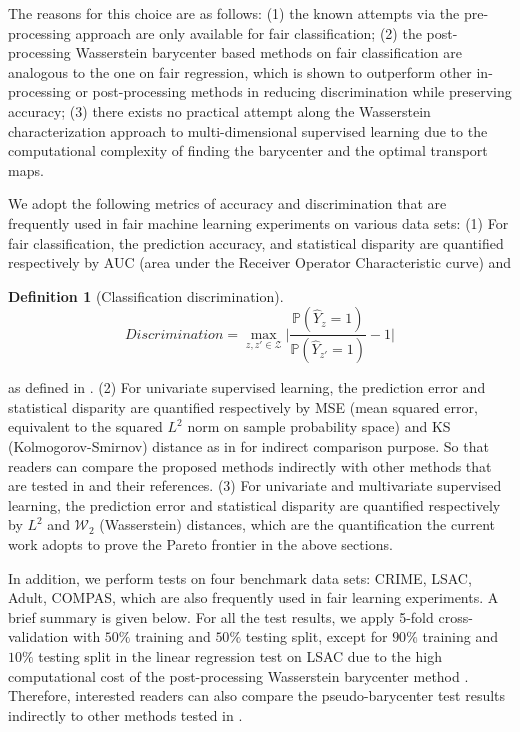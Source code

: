 \documentclass[twoside,11pt]{article}
\newtheorem{defi}{Definition}[section]{\bfseries}{\itshape}
\begin{document}
The reasons for this choice are as follows: (1) the known attempts via the pre-processing approach are only available for fair classification; (2) the post-processing Wasserstein barycenter based methods on fair classification are analogous to the one on fair regression, which is shown to outperform other in-processing or post-processing methods in reducing discrimination while preserving accuracy; (3) there exists no practical attempt along the Wasserstein characterization approach to multi-dimensional supervised learning due to the computational complexity of finding the barycenter and the optimal transport maps. 

We adopt the following metrics of accuracy and discrimination that are frequently used in fair machine learning experiments on various data sets: (1) For fair classification, the prediction accuracy, and statistical disparity are quantified respectively by AUC (area under the Receiver Operator Characteristic curve) and

\begin{defi}[Classification discrimination] \label{classification disparity}
$$Discrimination = \max_{z,z' \in \mathcal{Z}}{\Big|\frac{\mathbb{P}(\hat{Y}_z = 1)}{\mathbb{P}(\hat{Y}_{z'} = 1)} - 1\Big|}$$
\end{defi}
as defined in \cite{calmon2017optimized}. (2) For univariate supervised learning, the prediction error and statistical disparity are quantified respectively by MSE (mean squared error, equivalent to the squared $L^2$ norm on sample probability space) and KS (Kolmogorov-Smirnov) distance as in \cite{chzhen2020fair} for indirect comparison purpose. So that readers can compare the proposed methods indirectly with other methods that are tested in \cite{calmon2017optimized,  chzhen2020fair, zemel2013learning} and their references. (3) For univariate and multivariate supervised learning, the prediction error and statistical disparity are quantified respectively by $L^2$ and $\mathcal{W}_2$ (Wasserstein) distances, which are the quantification the current work adopts to prove the Pareto frontier in the above sections.

In addition, we perform tests on four benchmark data sets: CRIME, LSAC, Adult, COMPAS, which are also frequently used in fair learning experiments. A brief summary is given below. For all the test results, we apply 5-fold cross-validation with $50\%$ training and $50\%$ testing split, except for $90\%$ training and $10\%$ testing split in the linear regression test on LSAC due to the high computational cost of the post-processing Wasserstein barycenter method \cite{chzhen2020fair}. Therefore, interested readers can also compare the pseudo-barycenter test results indirectly to other methods tested in \cite{calmon2017optimized,chzhen2020fair}.\\
\end{document}
